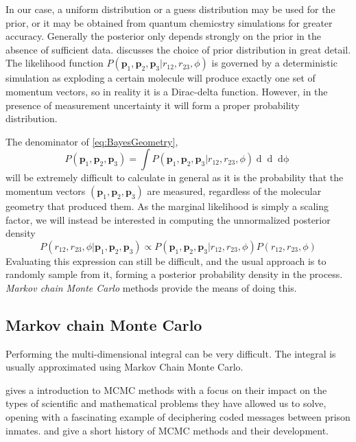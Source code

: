 In our case, a uniform distribution or a guess distribution may be used for the prior, or it may be obtained from quantum chemicstry simulations for greater accuracy. Generally the posterior only depends strongly on the prior in the absence of sufficient data. \citet{Gelman14} discusses the choice of prior distribution in great detail. The likelihood function $P(\mathbf{p}_1, \mathbf{p}_2, \mathbf{p}_3|r_{12}, r_{23}, \phi)$ is governed by a deterministic simulation as exploding a certain molecule will produce exactly one set of momentum vectors, so in reality it is a Dirac-delta function. However, in the presence of measurement uncertainty it will form a proper probability distribution.

The denominator of \eqref{eq:BayesGeometry},
\begin{equation}
  P(\mathbf{p}_1, \mathbf{p}_2, \mathbf{p}_3) =
    \int P(\mathbf{p}_1, \mathbf{p}_2, \mathbf{p}_3|r_{12}, r_{23}, \phi)
    \mathop{dr_{12}} \mathop{dr_{23}} \mathop{d\phi}
\end{equation}
will be extremely difficult to calculate in general as it is the probability that the momentum vectors $(\mathbf{p}_1, \mathbf{p}_2, \mathbf{p}_3)$ are measured, regardless of the molecular geometry that produced them. As the marginal likelihood is simply a scaling factor, we will instead be interested in computing the unnormalized posterior density
\begin{equation}
  P(r_{12}, r_{23}, \phi|\mathbf{p}_1, \mathbf{p}_2, \mathbf{p}_3) \propto P(\mathbf{p}_1, \mathbf{p}_2, \mathbf{p}_3|r_{12}, r_{23}, \phi) P(r_{12}, r_{23}, \phi)
\end{equation}
Evaluating this expression can still be difficult, and the usual approach is to randomly sample from it, forming a posterior probability density in the process. \emph{Markov chain Monte Carlo} methods provide the means of doing this.

\subsection{Markov chain Monte Carlo}
Performing the multi-dimensional integral can be very difficult. The integral is usually approximated using Markov Chain Monte Carlo.

\citet{Diaconis09} gives a introduction to MCMC methods with a focus on their impact on the types of scientific and mathematical problems they have allowed us to solve, opening with a fascinating example of deciphering coded messages between prison inmates. \citet{Richey10} and \citet{Robert11} give a short history of MCMC methods and their development. 


